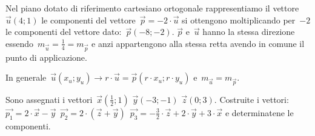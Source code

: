 \begin{comment}}
\mbox{}
\begin{minipage}{.49 \textwidth}
\end{minipage}
\hfill
\begin{minipage}{.49 \textwidth}
\end{minipage}
\end{comment}

\begin{esempio}
\mbox{}

\begin{minipage}{.49 \textwidth}
Nel piano dotato di riferimento cartesiano ortogonale rappresentiamo il 
vettore~\(\vec{u}(4;1)\) le componenti
del vettore~\(\vec{p}=-2\cdot \vec{u}\) si ottengono moltiplicando per~\(-2\) 
le componenti del vettore dato:~\(\vec{p}(-8;-2)\). \(\vec{p}\) e~\(\vec{u}\)
hanno la stessa direzione essendo~\(m_{\vec{u}}=\frac{1}{4}=m_{\vec{p}}\) e 
anzi appartengono alla stessa retta avendo in comune il punto di applicazione.
\end{minipage}
\hfill
\begin{minipage}{.49 \textwidth}
\begin{center}
 \scalebox{.8}{}
\end{center}
\end{minipage}
\end{esempio}

In generale~\(\vec{u}(x_u;y_u) \rightarrow r \cdot \vec{u}=
             \vec{p}(r \cdot x_u; 
             r \cdot y_u)\) e~\(m_{\vec{u}}=m_{\vec{p}}\).
   
%  

\begin{esempio}

Sono assegnati i vettori~\(\vec{x}(\frac {1}{2};1)\) \(\vec{y}(-3;-1)\) 
\(\vec{z}(0;3)\).
Costruite i vettori:~\(\vec{p_1}=2 \cdot \vec{x}-\vec{y}\)\, \(\vec{p_2}=2 \cdot 
(\vec{z}+\vec{y})\)\, \(\vec{p_3}=-\frac {3}{2} \cdot \vec{z} +2 \cdot \vec{y}+3 
\cdot \vec{x}\)
e determinatene le componenti.
\end{esempio}

